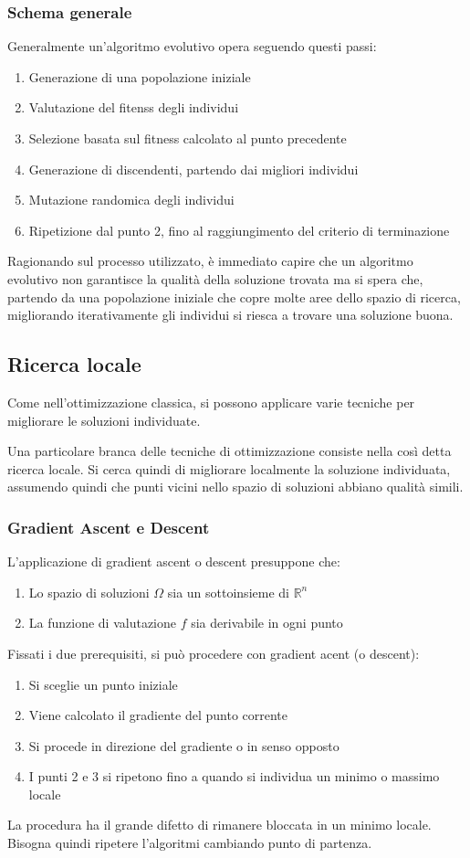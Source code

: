 \documentclass[a4paper]{article}
\begin{document}
\subsubsection{Schema generale}
Generalmente un'algoritmo evolutivo opera seguendo questi passi:
\begin{enumerate}
    \item Generazione di una popolazione iniziale
    \item Valutazione del fitenss degli individui
    \item Selezione basata sul fitness calcolato al punto precedente
    \item Generazione di discendenti, partendo dai migliori individui
    \item Mutazione randomica degli individui
    \item Ripetizione dal punto 2, fino al raggiungimento del criterio di terminazione
\end{enumerate}
Ragionando sul processo utilizzato, è immediato capire che un algoritmo evolutivo non garantisce
la qualità della soluzione trovata ma si spera che, partendo da una popolazione iniziale 
che copre molte aree dello spazio di ricerca, migliorando iterativamente gli individui 
si riesca a trovare una soluzione buona.

\subsection{Ricerca locale}
Come nell'ottimizzazione classica, si possono applicare varie tecniche per 
migliorare le soluzioni individuate.

Una particolare branca delle tecniche di ottimizzazione consiste nella così 
detta ricerca locale. Si cerca quindi di migliorare localmente la soluzione 
individuata, assumendo quindi che punti 
vicini nello spazio di soluzioni abbiano qualità simili.

\subsubsection{Gradient Ascent e Descent}
L'applicazione di gradient ascent o descent presuppone che:
\begin{enumerate}
    \item Lo spazio di soluzioni $\Omega$ sia un sottoinsieme di $ \mathbb{R}^n$
    \item La funzione di valutazione $f$ sia derivabile in ogni punto
\end{enumerate}
Fissati i due prerequisiti, si può procedere con gradient acent (o descent):
\begin{enumerate}
    \item Si sceglie un punto iniziale
    \item Viene calcolato il gradiente del punto corrente
    \item Si procede in direzione del gradiente o in senso opposto
    \item I punti 2 e 3 si ripetono fino a quando si individua un minimo o massimo locale
\end{enumerate}
La procedura ha il grande difetto di rimanere bloccata in un minimo locale. Bisogna quindi 
ripetere l'algoritmi cambiando punto di partenza.
\end{document}
